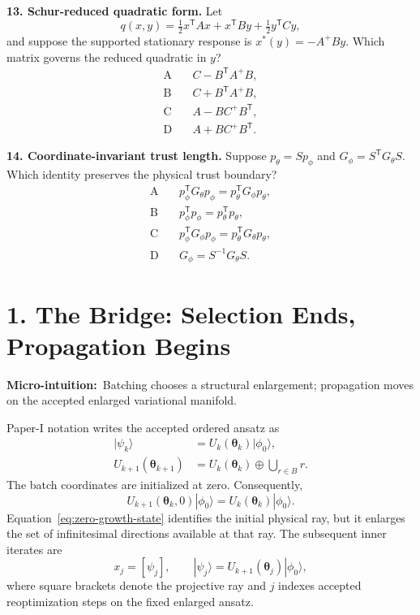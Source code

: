 \documentclass[10pt,twocolumn]{article}
\newcommand{\ket}[1]{|#1\rangle}
\newcommand{\micro}[1]{\par\noindent\textbf{Micro-intuition:}\ #1\par}
\begin{document}
\textbf{13. Schur-reduced quadratic form.}
Let
\[
q(x,y)=\tfrac12x^{\mathsf T}Ax+x^{\mathsf T}By
+\tfrac12y^{\mathsf T}Cy,
\]
and suppose the supported stationary response is
\(x^*(y)=-A^+By\). Which matrix governs the reduced quadratic in \(y\)?
\[
\begin{aligned}
\mathrm{A}\quad&C-B^{\mathsf T}A^+B,\\
\mathrm{B}\quad&C+B^{\mathsf T}A^+B,\\
\mathrm{C}\quad&A-B C^+B^{\mathsf T},\\
\mathrm{D}\quad&A+B C^+B^{\mathsf T}.
\end{aligned}
\]

\textbf{14. Coordinate-invariant trust length.}
Suppose \(p_\theta=Sp_\phi\) and
\(G_\phi=S^{\mathsf T}G_\theta S\). Which identity preserves the physical
trust boundary?
\[
\begin{aligned}
\mathrm{A}\quad&p_\phi^{\mathsf T}G_\theta p_\phi
=p_\theta^{\mathsf T}G_\phi p_\theta,\\
\mathrm{B}\quad&p_\phi^{\mathsf T}p_\phi
=p_\theta^{\mathsf T}p_\theta,\\
\mathrm{C}\quad&p_\phi^{\mathsf T}G_\phi p_\phi
=p_\theta^{\mathsf T}G_\theta p_\theta,\\
\mathrm{D}\quad&G_\phi=S^{-1}G_\theta S.
\end{aligned}
\]

\clearpage
\section*{1. The Bridge: Selection Ends, Propagation Begins}

\micro{Batching chooses a structural enlargement; propagation moves on the
accepted enlarged variational manifold.}

Paper-I notation writes the accepted ordered ansatz as
\begin{align}
\ket{\psi_k}
&=U_k(\bm\theta_k)\ket{\phi_0},
\label{eq:accepted-state}\\
U_{k+1}(\bm\theta_{k+1})
&=U_k(\bm\theta_k)\oplus\bigcup_{r\in B}r.
\label{eq:accepted-growth}
\end{align}
The batch coordinates are initialized at zero. Consequently,
\begin{equation}
U_{k+1}(\bm\theta_k,0)\ket{\phi_0}
=U_k(\bm\theta_k)\ket{\phi_0}.
\label{eq:zero-growth-state}
\end{equation}
Equation~\eqref{eq:zero-growth-state} identifies the initial physical ray, but
it enlarges the set of infinitesimal directions available at that ray. The
subsequent inner iterates are
\begin{equation}
x_j=[\psi_j],
\qquad
\ket{\psi_j}=U_{k+1}(\bm\theta_j)\ket{\phi_0},
\label{eq:inner-rays}
\end{equation}
where square brackets denote the projective ray and \(j\) indexes accepted
reoptimization steps on the fixed enlarged ansatz.
\end{document}
